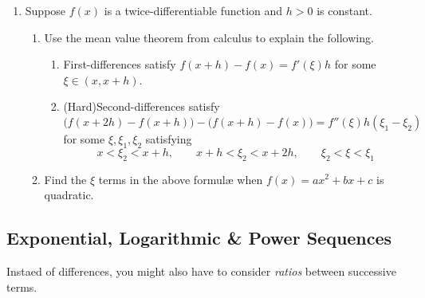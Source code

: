 \begin{exercises}{}{}
\begin{enumerate}
	  
	  \item Suppose $f(x)$ is a twice-differentiable function and $h>0$ is constant.
	  \begin{enumerate}
	    \item Use the mean value theorem from calculus to explain the following.
	  	\begin{enumerate}
	    	\item First-differences satisfy $f(x+h)-f(x)=f'(\xi) h$ for some $\xi\in (x,x+h)$.
	    	\item (Hard)\lstsp Second-differences satisfy
	    	\[
	    		\big(f(x+2h)-f(x+h)\big)-\big(f(x+h)-f(x)\big)=f''(\xi)h(\xi_1-\xi_2)
	    	\]
	    	for some $\xi,\xi_1,\xi_2$ satisfying
	    	\[
	    		x<\xi_2<x+h,\qquad
	    		x+h<\xi_2<x+2h,\qquad
	    		\xi_2<\xi<\xi_1
	    	\]
	    \end{enumerate}
	    \item Find the $\xi$ terms in the above formulæ when $f(x)=ax^2+bx+c$ is quadratic.
	  \end{enumerate}
	\end{enumerate}
\end{exercises}


\clearpage



\subsection{Exponential, Logarithmic \& Power Sequences}

Instaed of differences, you might also have to consider \emph{ratios} between successive terms.

